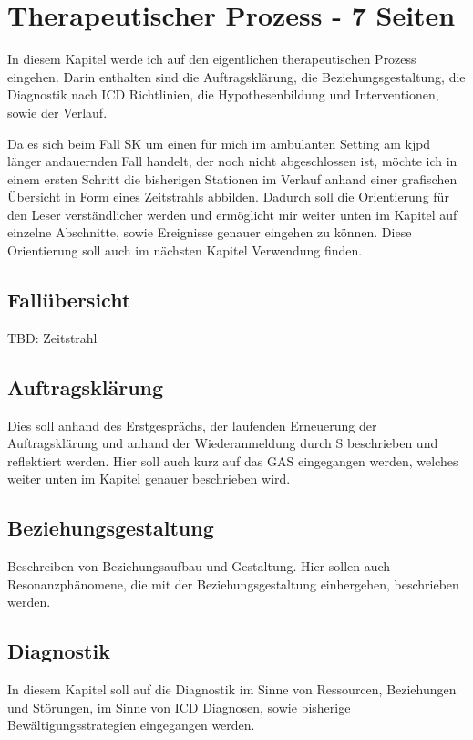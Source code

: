 \section{Therapeutischer Prozess - 7 Seiten}\label{Prozess}
In diesem Kapitel werde ich auf den eigentlichen therapeutischen Prozess eingehen. Darin enthalten sind die Auftragsklärung, die Beziehungsgestaltung, die Diagnostik nach ICD Richtlinien, die Hypothesenbildung und Interventionen, sowie der Verlauf.   

Da es sich beim Fall SK um einen für mich im ambulanten Setting am \ac{kjpd} länger andauernden Fall handelt, der noch nicht abgeschlossen ist, möchte ich in einem ersten Schritt die bisherigen Stationen im Verlauf anhand einer grafischen Übersicht in Form eines Zeitstrahls abbilden. Dadurch soll die Orientierung für den Leser verständlicher werden und ermöglicht mir weiter unten im Kapitel  auf einzelne Abschnitte, sowie Ereignisse genauer eingehen zu können. Diese Orientierung soll auch im nächsten Kapitel  Verwendung finden. 

\subsection{Fallübersicht}
TBD: Zeitstrahl

\subsection{Auftragsklärung}\label{Auftragsklärung} Dies soll anhand des Erstgesprächs, der laufenden Erneuerung der Auftragsklärung und anhand der Wiederanmeldung durch S beschrieben und reflektiert werden. Hier soll auch kurz auf das GAS eingegangen werden, welches weiter unten im Kapitel  	genauer beschrieben wird. 


\subsection{Beziehungsgestaltung} Beschreiben von Beziehungsaufbau und Gestaltung. Hier sollen auch Resonanzphänomene, die mit der Beziehungsgestaltung einhergehen, beschrieben werden. 
\subsection{Diagnostik} In diesem Kapitel soll auf die Diagnostik im Sinne von   Ressourcen, Beziehungen und Störungen, im Sinne von ICD Diagnosen, sowie bisherige Bewältigungsstrategien eingegangen werden. 
